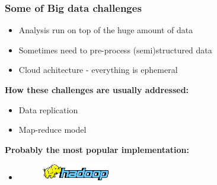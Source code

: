 \documentclass[10pt,utf8]{beamer}
\begin{document}
\begin{frame}
	\frametitle{Some of Big data challenges}
	\begin{itemize}
		\item Analysis run on top of the huge amount of data
		\item Sometimes need to pre-process (semi)structured data
		\item Cloud achitecture - everything is ephemeral
	\end{itemize}

	 {	
		\vspace{0.5cm}
		\textbf{How these challenges are usually addressed:}
			\begin{itemize}
			\item Data replication
			\item Map-reduce model
		\end{itemize}
	}
	
	 {
		\vspace{0.5cm}
		\textbf{Probably the most popular implementation:}
		\begin{itemize}
			\item
				\begin{figure}
					\includegraphics[width=3cm, left]{./img/hadoop-logo.eps}
				\end{figure}	
		\end{itemize}
	}

\end{frame}
\end{document}
